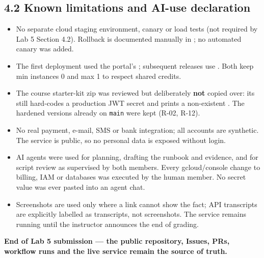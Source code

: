 \documentclass[11pt,a4paper]{article}
\begin{document}
\subsection*{4.2 Known limitations and AI-use declaration}
\begin{itemize}[leftmargin=*]
\item No separate cloud staging environment, canary or load tests (not required by Lab 5 Section 4.2). Rollback is documented manually in ; no automated canary was added.
\item The first deployment used the portal's ; subsequent releases use . Both keep min instances 0 and max 1 to respect shared credits.
\item The course starter-kit zip was reviewed but deliberately \textbf{not} copied over: its  still hard-codes a production JWT secret and prints a non-existent . The hardened versions already on \texttt{main} were kept (R-02, R-12).
\item No real payment, e-mail, SMS or bank integration; all accounts are synthetic. The service is public, so no personal data is exposed without login.
\item AI agents were used for planning, drafting the runbook and evidence, and for script review as supervised by both members. Every gcloud/console change to billing, IAM or databases was executed by the human member. No secret value was ever pasted into an agent chat.
\item Screenshots are used only where a link cannot show the fact; API transcripts are explicitly labelled as transcripts, not screenshots. The service remains running until the instructor announces the end of grading.
\end{itemize}

\vspace{2em}
\begin{center}
\small\textcolor{tggreen}{\textbf{End of Lab 5 submission --- the public repository, Issues, PRs, workflow runs and the live service remain the source of truth.}}
\end{center}
\end{document}
